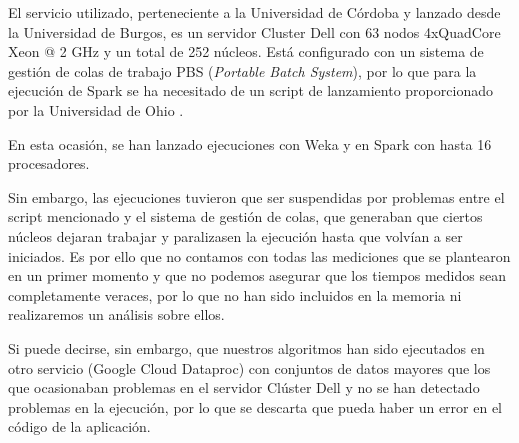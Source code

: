 El servicio utilizado, perteneciente a la Universidad de Córdoba y lanzado desde la Universidad de Burgos, es un servidor Cluster Dell con 63 nodos 4xQuadCore Xeon @ 2 GHz y un total de 252 núcleos. Está configurado con un sistema de gestión de colas de trabajo PBS (\textit{Portable Batch System}), por lo que para la ejecución de Spark se ha necesitado de un script de lanzamiento proporcionado por la Universidad de Ohio \cite{baer2015integrating}.

En esta ocasión, se han lanzado ejecuciones con Weka y en Spark con hasta 16 procesadores.

Sin embargo, las ejecuciones tuvieron que ser suspendidas por problemas entre el script mencionado y el sistema de gestión de colas, que generaban que ciertos núcleos dejaran trabajar y paralizasen la ejecución hasta que volvían a ser iniciados. Es por ello que no contamos con todas las mediciones que se plantearon en un primer momento y que no podemos asegurar que los tiempos medidos sean completamente veraces, por lo que no han sido incluidos en la memoria ni realizaremos un análisis sobre ellos.

Si puede decirse, sin embargo, que nuestros algoritmos han sido ejecutados en otro servicio (Google Cloud Dataproc) con conjuntos de datos mayores que los que ocasionaban problemas en el servidor Clúster Dell y no se han detectado problemas en la ejecución, por lo que se descarta que pueda haber un error en el código de la aplicación.


